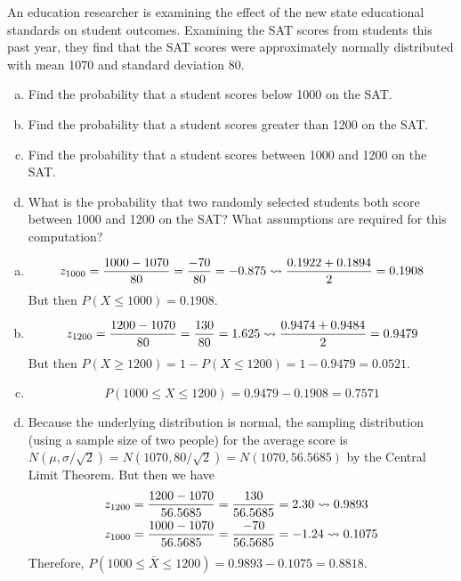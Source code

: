\documentclass[11pt,letterpaper]{article}
\begin{document}

 An education researcher is examining the effect of the new state educational standards on student outcomes. Examining the SAT scores from students this past year, they find that the SAT scores were approximately normally distributed with mean 1070 and standard deviation 80.
	\begin{enumerate}[(a)]
	\item Find the probability that a student scores below 1000 on the SAT.
	\item Find the probability that a student scores greater than 1200 on the SAT.
	\item Find the probability that a student scores between 1000 and 1200 on the SAT.
	\item What is the probability that two randomly selected students both score between 1000 and 1200 on the SAT? What assumptions are required for this computation? 
	\end{enumerate} \pspace

\sol
\begin{enumerate}[(a)]
\item 
	\[
	z_{1000}= \dfrac{1000 - 1070}{80}= \dfrac{-70}{80}= -0.875 \rightsquigarrow \dfrac{0.1922 + 0.1894}{2}= 0.1908
	\] 
But then $P(X \leq 1000)= 0.1908$. \pspace

\item 
	\[
	z_{1200}= \dfrac{1200 - 1070}{80}= \dfrac{130}{80}= 1.625 \rightsquigarrow \dfrac{0.9474 + 0.9484}{2}= 0.9479
	\] 
But then $P(X \geq 1200)= 1 - P(X \leq 1200)= 1 - 0.9479= 0.0521$. \pspace

\item 
	\[
	P(1000 \leq X \leq 1200)= 0.9479 - 0.1908= 0.7571
	\] \pspace

\item Because the underlying distribution is normal, the sampling distribution (using a sample size of two people) for the average score is $N(\mu, \sigma/\sqrt{2})= N(1070, 80/\sqrt{2})= N(1070, 56.5685)$ by the Central Limit Theorem. But then we have
	\[
	\begin{aligned}
	z_{1200}&= \dfrac{1200 - 1070}{56.5685}= \dfrac{130}{56.5685}= 2.30 \rightsquigarrow 0.9893 \\
	z_{1000}&= \dfrac{1000 - 1070}{56.5685}= \dfrac{-70}{56.5685}= -1.24 \rightsquigarrow 0.1075
	\end{aligned}
	\]
Therefore, $P(1000 \leq \overline{X} \leq 1200)= 0.9893 - 0.1075= 0.8818$. 
\end{enumerate}
\end{document}
